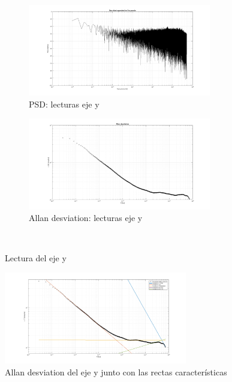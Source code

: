 \documentclass[a4paper,11pt,twoside]{IT-CNEA}
\begin{document}
\begin{figure}[t!]
    \centering
    \begin{subfigure}[t]{0.5\textwidth}
        \centering
        \includegraphics[width=8cm]{Figuras/PSDGyroy.png}
        \caption{PSD: lecturas eje y}
        \label{fig:}
    \end{subfigure}%
    \begin{subfigure}[t]{0.5\textwidth}
        \centering
        \includegraphics[width=8cm]{Figuras/AllanGyroy.png}
        \caption{Allan desviation: lecturas eje y}
        \label{fig:}
    \end{subfigure}%
    ~ 
    \caption{Lectura del eje y}
    \label{fig:lecturasEjey}
\end{figure}
\begin{figure}[h!]
\centering
\includegraphics[width=8cm]{Figuras/AllanGyroyRectas.png}
\caption{Allan desviation del eje y junto con las rectas características}
\label{fig:lecturaEjeyRectas}
\end{figure}
\end{document}
